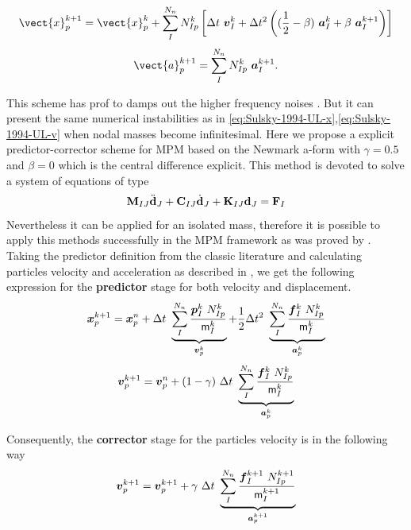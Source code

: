 \begin{equation}
\label{eq:Tran-2019-GA-x}
  \vect{x}_p^{k+1} = \vect{x}_p^{k} + 
  \sum^{N_n}_{I}N_{Ip}^{k} \left[ \Delta t\ \vec{v}_{I}^{k}+ \Delta t^2\left( (\frac{1}{2} - \beta)\
    \vec{a}_{I}^{k} + \beta\ \vec{a}_{I}^{k+1} \right) \right]
\end{equation}
\begin{equation}
  \label{eq:Tran-2019-GA-a}
  \vect{a}_p^{k+1} = \sum^{N_n}_{I}N_{Ip}^{k}\ \vec{a}_{I}^{k+1}.
\end{equation}

This scheme has prof to damps out the higher frequency noises
\cite{Tran2019e}. But it can present the same numerical instabilities
as in \eqref{eq:Sulsky-1994-UL-x},\eqref{eq:Sulsky-1994-UL-v} when nodal masses become infinitesimal.
Here we propose a explicit predictor-corrector scheme for MPM based on the Newmark a-form with
$\gamma = 0.5$ and $\beta = 0$ which is the central difference
explicit. This method is devoted to solve a system of equations of type
\begin{equation*}
  \mathbf{{M}}_{IJ}\ddot{\mathbf{{d}}}_{J} + \mathbf{{C}}_{IJ}\dot{\mathbf{{d}}}_{J} +
  \mathbf{{K}}_{IJ}\mathbf{{d}}_{J} = \mathbf{{F}}_{I}
\end{equation*}
Nevertheless it can be applied for an isolated mass, therefore it is
possible to apply this methods successfully in the MPM framework as
was proved by \cite{Tran2019e}. Taking the predictor
definition from the classic literature \cite{Hughes2000} and
calculating particles velocity and acceleration as described in 
\cite{Zhang_book_2016}, we get the following expression for the
\textbf{predictor} stage for both velocity and displacement.
\begin{equation}
  \label{eq:5}
  \vec{x}_p^{k+1} = \vec{x}_p^n + \Delta t\
  \underbrace{\sum^{N_n}_{I}\frac{\vec{p}_{I}^{k}\
      N_{Ip}^k}{\tens{m}_I^k}}_{\vec{v}_p^{k}} + \frac{1}{2}\Delta
  t^2\ \underbrace{\sum^{N_n}_{I}\frac{\vec{f}_{I}^{k}\
      N_{Ip}^k}{\tens{m}_I^k}}_{\vec{a}_p^{k}}
\end{equation}
\begin{equation}
  \label{eq:Predictor-velocity}
  \vec{v}_p^{k+1} = \vec{v}_p^n + (1 - \gamma)\ \Delta t\
  \underbrace{\sum^{N_n}_{I}\frac{\vec{f}_{I}^{k}\
      N_{Ip}^k}{\tens{m}_I^k}}_{\vec{a}_p^{k}}
\end{equation}

Consequently, the \textbf{corrector} stage for the particles velocity is in the
following way
\begin{equation}
  \vec{v}_{p}^{k+1} = \vec{v}_{p}^{k+1} +
  \gamma\ \Delta t\ \underbrace{\sum^{N_n}_{I}\frac{\vec{f}_{I}^{k+1}\ N_{Ip}^{k+1}}{\tens{m}_I^{k+1}}}_{\vec{a}_p^{k+1}}  
\end{equation}

